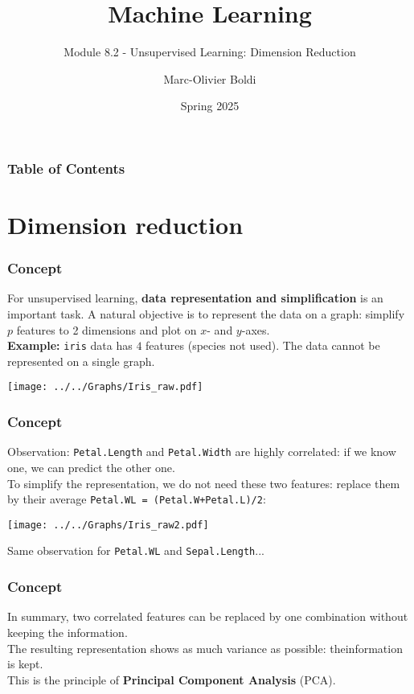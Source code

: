
\title{Machine Learning}
\subtitle{Module 8.2 - Unsupervised Learning: Dimension Reduction}
\author[MOB]{Marc-Olivier Boldi}
\date{Spring 2025}

\begin{frame}
  \titlepage
\end{frame}
\begin{frame}
\frametitle{Table of Contents}
	\tableofcontents
\end{frame}
\section{Dimension reduction}
\begin{frame}
\frametitle{Concept}
For unsupervised learning, {\bf data representation and simplification} is an important task. A natural objective is to represent the data on a graph: simplify $p$ features to 2 dimensions and plot on $x$- and $y$-axes. \\
\vspace{0.2cm}
{\bf Example:} {\tt iris} data has $4$ features (species not used). The data cannot be represented on a single graph.
\begin{center}
\texttt{[image: ../../Graphs/Iris\_raw.pdf]}
\end{center} 
\end{frame}
\begin{frame}
\frametitle{Concept}
Observation: {\tt Petal.Length} and {\tt Petal.Width} are highly correlated: if we know one, we can predict the other one.\\
\vspace{0.3cm}
To simplify the representation, we do not need these two features: replace them by their average {\tt Petal.WL = (Petal.W+Petal.L)/2}:
\begin{center}
\texttt{[image: ../../Graphs/Iris\_raw2.pdf]}
\end{center} 
Same observation for {\tt Petal.WL} and {\tt Sepal.Length}...
\end{frame}
\begin{frame}
\frametitle{Concept}
In summary, two correlated features can be replaced by one combination without keeping the information. \\
\vspace{0.3cm}
The resulting representation shows as much variance as possible: theinformation is kept.\\
\vspace{0.3cm}
This is the principle of {\bf Principal Component Analysis} (PCA).
\end{frame}
